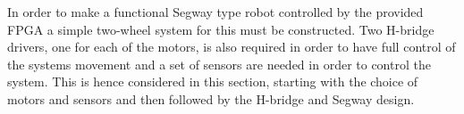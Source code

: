 In order to make a functional Segway type robot controlled by the provided FPGA a simple two-wheel system for this must be constructed.
Two H-bridge drivers, one for each of the motors, is also required in order to have full control of the systems movement and a set of sensors are needed in order to control the system.
This is hence considered in this section, starting with the choice of motors and sensors and then followed by the H-bridge and Segway design.
